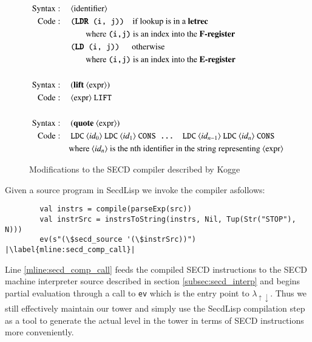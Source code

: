 \documentclass[a4paper,12pt,twoside,openright]{report}
\theoremstyle{definition}
\newcommand{\mslang}{$\lambda_{\uparrow\downarrow}$}
\newcommand{\secdlisp}{SecdLisp}
\begin{document}
\begin{figure}[ht!]
\centering
\begin{alignat}{5}
		\text{Syntax}   & : && \: \text{$\langle$identifier$\rangle$} \\
		\text{Code}     & : && \: \texttt{(\textbf{LDR} (i, j))} \quad \text{if lookup is in a \textbf{letrec}} \nonumber \\
		& && \qquad\text{where \texttt{(i,j)} is an index into the \textbf{F-register}} \nonumber \\
		& && \: \texttt{(\textbf{LD} (i, j))} \quad\:\: \text{otherwise} \nonumber \\
		& && \qquad\text{where \texttt{(i,j)} is an index into the \textbf{E-register}} \nonumber \\
		\nonumber \\%
		\text{Syntax}   & : && \: \text{(\textbf{lift} $\langle$expr$\rangle$)} \\
		\text{Code}     & : && \: \text{$\langle$expr$\rangle$ \texttt{LIFT}} \nonumber \\
		\nonumber \\%
		\text{Syntax}   & : && \: \text{(\textbf{quote} $\langle$expr$\rangle$)} \label{eq:secd_comp_sem_quote} \\
		\text{Code}     & : && \: \text{\texttt{LDC} $\langle id_{0} \rangle$ \texttt{LDC} $\langle id_{1} \rangle$ \texttt{CONS ... LDC} $\langle id_{n-1} \rangle$ \texttt{LDC} $\langle id_{n} \rangle$ \texttt{CONS}} \nonumber \\
		& && \text{where $\langle id_{n} \rangle$ is the nth identifier in the string representing $\langle$expr$\rangle$} \nonumber
\end{alignat}
\caption{Modifications to the SECD compiler described by Kogge \cite{kogge1990architecture}}
\label{fig:secd_comp_semantics}
\end{figure}
\newpage

Given a source program in \secdlisp{} we invoke the compiler asfollows:
\begin{verbatim}
        val instrs = compile(parseExp(src))
        val instrSrc = instrsToString(instrs, Nil, Tup(Str("STOP"), N)))
        ev(s"(\$secd_source '(\$instrSrc))") |\label{mline:secd_comp_call}|
\end{verbatim}

Line \ref{mline:secd_comp_call} feeds the compiled SECD instructions to the SECD machine interpreter source described in section \ref{subsec:secd_interp} and begins partial evaluation through a call to \texttt{ev} which is the entry point to \mslang. Thus we still effectively maintain our tower and simply use the \secdlisp{} compilation step as a tool to generate the actual level in the tower in terms of SECD instructions more conveniently.
\end{document}
